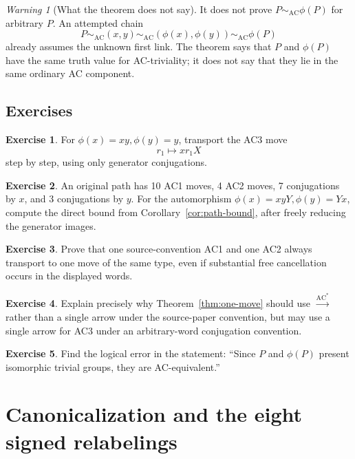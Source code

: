 \documentclass[11pt]{article}
\theoremstyle{definition}
\newtheorem{exercise}{Exercise}[section]
\theoremstyle{remark}
\newtheorem{warning}[theorem]{Warning}
\newcommand{\AC}{\mathrm{AC}}
\begin{document}
\begin{warning}[What the theorem does not say]
It does not prove \(P\sim_{\AC}\phi(P)\) for arbitrary \(P\).  An attempted
chain
\[
P\sim_{\AC}(x,y)\sim_{\AC}(\phi(x),\phi(y))
\sim_{\AC}\phi(P)
\]
already assumes the unknown first link.  The theorem says that \(P\) and
\(\phi(P)\) have the same truth value for AC-triviality; it does not say
that they lie in the same ordinary AC component.
\end{warning}

\subsection*{Exercises}

\begin{exercise}
For \(\phi(x)=xy,\phi(y)=y\), transport the AC3 move
\[
  r_1\mapsto x r_1X
\]
step by step, using only generator conjugations.
\end{exercise}

\begin{exercise}
An original path has 10 AC1 moves, 4 AC2 moves, 7 conjugations by \(x\),
and 3 conjugations by \(y\).  For the automorphism
\(\phi(x)=xyY,\phi(y)=Yx\), compute the direct bound from
Corollary~\ref{cor:path-bound}, after freely reducing the generator images.
\end{exercise}

\begin{exercise}
Prove that one source-convention AC1 and one AC2 always transport to one
move of the same type, even if substantial free cancellation occurs in
the displayed words.
\end{exercise}

\begin{exercise}
Explain precisely why Theorem~\ref{thm:one-move} should use
\(\xrightarrow{\AC^*}\) rather than a single arrow under the source-paper
convention, but may use a single arrow for AC3 under an arbitrary-word
conjugation convention.
\end{exercise}

\begin{exercise}
Find the logical error in the statement:
``Since \(P\) and \(\phi(P)\) present isomorphic trivial groups, they are
AC-equivalent.''
\end{exercise}

\section{Canonicalization and the eight signed relabelings}
\label{sec:canonical-relabel}
\end{document}
